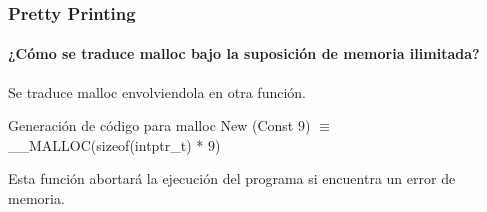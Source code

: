\begin{frame}
\frametitle{Pretty Printing}
\framesubtitle{¿Cómo se traduce malloc bajo la suposición de memoria ilimitada?}

Se traduce malloc envolviendola en otra función.

\begin{block}{Generación de código para malloc}
New (Const $9$) $\equiv$ \_\_MALLOC(sizeof(intptr\_t) * $9$)
\end{block}

\bigskip

Esta función abortará la ejecución del programa si encuentra un error de memoria.


\end{frame}


\begin{comment}
\begin{frame}
\frametitle{Exportando Código C}
\framesubtitle{Exportar a un archivo}

Se provee con un mecanismo que permite exportar el programa generado en código C a un archivo en un directorio determinado.


\end{frame}
\end{comment}
